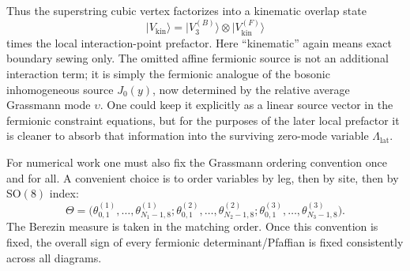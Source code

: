 \documentclass[11pt]{article}
\numberwithin{equation}{section}
\begin{document}
Thus the superstring cubic vertex factorizes into a kinematic overlap state
\begin{equation}
\label{eq:s13-012}
|V_{\mathrm{kin}}\rangle = |V_3^{(B)}\rangle \otimes |V^{(F)}_{\mathrm{kin}}\rangle
\end{equation}
times the local interaction-point prefactor. Here ``kinematic'' again means exact boundary sewing only. The omitted affine fermionic source is not an additional interaction term; it is simply the fermionic analogue of the bosonic inhomogeneous source $J_0(y)$, now determined by the relative average Grassmann mode $\upsilon$. One could keep it explicitly as a linear source vector in the fermionic constraint equations, but for the purposes of the later local prefactor it is cleaner to absorb that information into the surviving zero-mode variable $\Lambda_{\mathrm{lat}}$.

For numerical work one must also fix the Grassmann ordering convention once and for all. A convenient choice is to order variables by leg, then by site, then by SO$(8)$ index:
\begin{equation}
\label{eq:s13-013}
\Theta=
\bigl(
\theta^{(1)}_{0,1},\dots,\theta^{(1)}_{N_1-1,8};
\theta^{(2)}_{0,1},\dots,\theta^{(2)}_{N_2-1,8};
\theta^{(3)}_{0,1},\dots,\theta^{(3)}_{N_3-1,8}
\bigr).
\end{equation}
The Berezin measure is taken in the matching order. Once this convention is fixed, the overall sign of every fermionic determinant/Pfaffian is fixed consistently across all diagrams.
\end{document}
